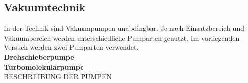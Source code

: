 \subsection{Vakuumtechnik}
In der Technik sind Vakuumpumpen unabdingbar.
Je nach Einsatzbereich und Vakuumbereich werden unterschiedliche Pumparten genutzt.
Im vorliegenden Versuch werden zwei Pumparten verwendet.\\
\textbf{Drehschieberpumpe}\\
\textbf{Turbomolekularpumpe}\\
BESCHREIBUNG DER PUMPEN
